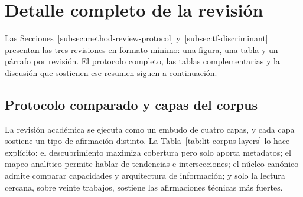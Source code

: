 \section{Detalle completo de la revisión}
\label{app:review-full-detail}

Las Secciones~\ref{subsec:method-review-protocol} y~\ref{subsec:tf-discriminant}
presentan las tres revisiones en formato mínimo: una figura, una tabla y un
párrafo por revisión. El protocolo completo, las tablas complementarias y la
discusión que sostienen ese resumen siguen a continuación.

\subsection{Protocolo comparado y capas del corpus}
\label{app:review-protocol-full}

La revisión académica se ejecuta como un embudo de cuatro capas, y cada capa
sostiene un tipo de afirmación distinto. La Tabla~\ref{tab:lit-corpus-layers}
lo hace explícito: el descubrimiento maximiza cobertura pero solo aporta
metadatos; el mapeo analítico permite hablar de tendencias e intersecciones;
el núcleo canónico admite comparar capacidades y arquitectura de información;
y solo la lectura cercana, sobre veinte trabajos, sostiene las afirmaciones
técnicas más fuertes.



